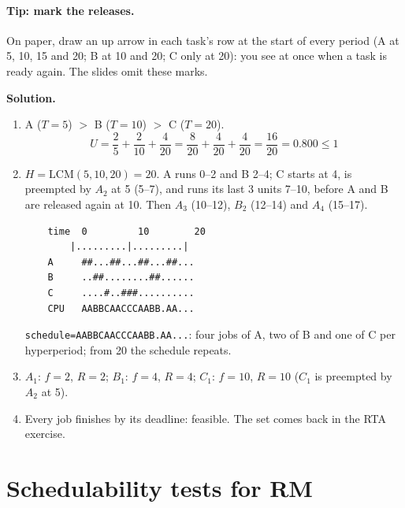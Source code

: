 \paragraph{Tip: mark the releases.} On paper, draw an up arrow in each task's row at the start of every period (A at 5, 10, 15 and 20; B at 10 and 20; C only at 20): you see at once when a task is ready again. The slides omit these marks.

\textbf{Solution.}
\begin{enumerate}
    \item A ($T = 5$) $>$ B ($T = 10$) $>$ C ($T = 20$).
    \[
    U = \frac{2}{5} + \frac{2}{10} + \frac{4}{20} = \frac{8}{20} + \frac{4}{20} + \frac{4}{20} = \frac{16}{20} = 0.800 \le 1
    \]
    \item $H = \mathrm{LCM}(5, 10, 20) = 20$. A runs 0--2 and B 2--4; C starts at 4, is preempted by $A_2$ at 5 (5--7), and runs its last 3 units 7--10, before A and B are released again at 10. Then $A_3$ (10--12), $B_2$ (12--14) and $A_4$ (15--17).
\begin{verbatim}
    time  0         10        20
        |.........|.........|
    A     ##...##...##...##...
    B     ..##........##......
    C     ....#..###..........
    CPU   AABBCAACCCAABB.AA...
\end{verbatim}
    \texttt{schedule=AABBCAACCCAABB.AA...}: four jobs of A, two of B and one of C per hyperperiod; from 20 the schedule repeats.
    \item $A_1$: $f = 2$, $R = 2$; \quad $B_1$: $f = 4$, $R = 4$; \quad $C_1$: $f = 10$, $R = 10$ ($C_1$ is preempted by $A_2$ at 5).
    \item Every job finishes by its deadline: feasible. The set comes back in the RTA exercise.
\end{enumerate}

\section{Schedulability tests for RM}

